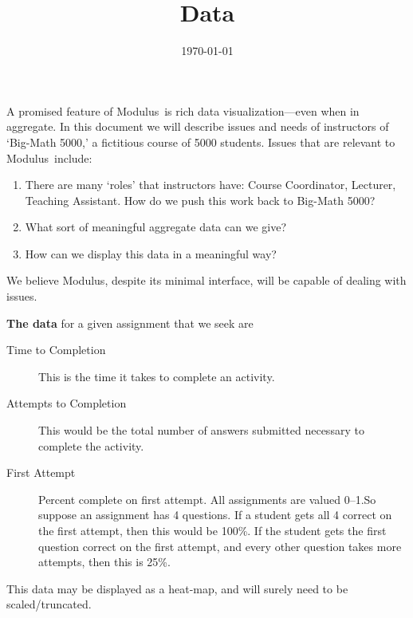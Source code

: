 \documentclass{techbrief}
\title{Data}
\date{\today}
\newcommand{\modulus}{\textsf{Modulus}}
\begin{document}
\pagestyle{main}%
\thispagestyle{title}
\lettrine[lines=2]{A}{} promised feature of \modulus\ is rich data visualization---even when in
aggregate.
In this document we will describe issues and needs of instructors of `Big-Math
5000,' a fictitious course of 5000 students.
Issues that are relevant to \modulus\ include:
\begin{enumerate}
    \item There are many `roles' that instructors have: Course Coordinator,
          Lecturer, Teaching Assistant. How do we push this work back to
          Big-Math 5000?
    \item What sort of meaningful aggregate data can we give?
    \item How can we display this data in a meaningful way?
\end{enumerate}

We believe \modulus, despite its minimal interface, will be capable of dealing with issues.

\begin{xframe}
    \textbf{The data} for a given assignment that we seek are 
    \begin{description}
        \item[Time to Completion] This is the time it takes to complete an
            activity.
        \item[Attempts to Completion] This would be the total number of answers
            submitted necessary to complete the activity.
        \item[First Attempt] Percent complete on first
            attempt. All assignments are valued
            0--1.So suppose an assignment has 4 questions. If a student gets
            all 4 correct on the first attempt, then this would be 100\%. If
            the
            student gets
            the first question correct on the first attempt, and every other
            question takes
            more attempts, then this is 25\%.
    \end{description}
    This data may be displayed as a heat-map, and will surely need to be
    scaled/truncated.
\end{xframe}
\end{document}
